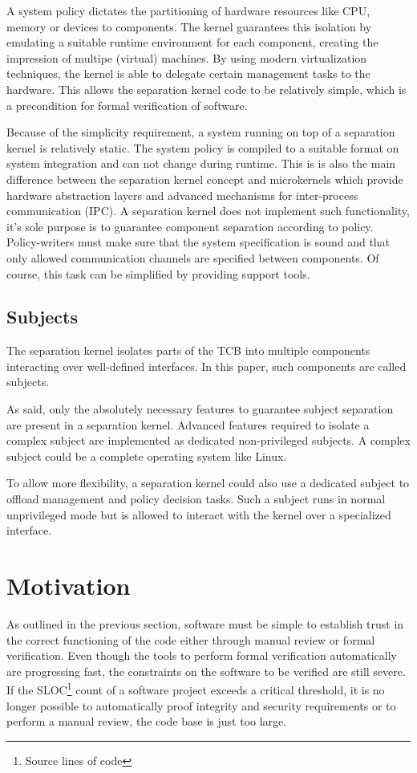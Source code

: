 A system policy dictates the partitioning of hardware resources like CPU, memory
or devices to components. The kernel guarantees this isolation by emulating a
suitable runtime environment for each component, creating the impression of
multipe (virtual) machines. By using modern virtualization techniques, the
kernel is able to delegate certain management tasks to the hardware. This allows
the separation kernel code to be relatively simple, which is a precondition for
formal verification of software.

Because of the simplicity requirement, a system running on top of a separation
kernel is relatively static. The system policy is compiled to a suitable format
on system integration and can not change during runtime. This is is also the
main difference between the separation kernel concept and microkernels which
provide hardware abstraction layers and advanced mechanisms for inter-process
communication (IPC). A separation kernel does not implement such
functionality, it's sole purpose is to guarantee component separation according
to policy. Policy-writers must make sure that the system specification is sound
and that only allowed communication channels are specified between components.
Of course, this task can be simplified by providing support tools.

\subsection{Subjects}
The separation kernel isolates parts of the TCB into multiple
components interacting over well-defined interfaces. In this
paper, such components are called subjects.

As said, only the absolutely necessary features to guarantee subject separation
are present in a separation kernel. Advanced features required to isolate a
complex subject are implemented as dedicated non-privileged subjects. A complex
subject could be a complete operating system like Linux.

To allow more flexibility, a separation kernel could also use a dedicated
subject to offload management and policy decision tasks. Such a subject runs in
normal unprivileged mode but is allowed to interact with the kernel over a
specialized interface.

\section{Motivation}
As outlined in the previous section, software must be simple to establish trust
in the correct functioning of the code either through manual review or formal
verification. Even though the tools to perform formal verification
automatically are progressing fast, the constraints on the software to be
verified are still severe. If the SLOC\footnote{Source lines of
code} count of a software project exceeds a critical threshold, it
is no longer possible to automatically proof integrity and security
requirements or to perform a manual review, the code base is just too large.

